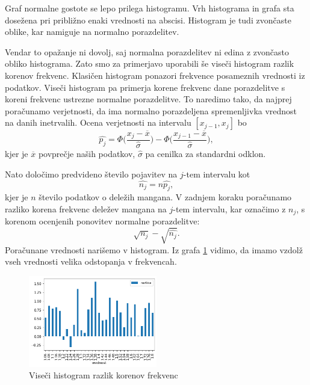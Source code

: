 \documentclass{article}
\begin{document}
Graf normalne gostote se lepo prilega histogramu. Vrh histograma in grafa sta dosežena pri 
približno enaki vrednosti na abscisi. Histogram je tudi zvončaste oblike, kar namiguje na normalno porazdelitev.

Vendar to opažanje ni dovolj, saj normalna porazdelitev ni edina z zvončasto obliko histograma.
Zato smo za primerjavo uporabili še viseči histogram razlik korenov frekvenc.
Klasičen histogram ponazori frekvence posameznih vrednosti iz podatkov. 
Viseči histogram pa primerja korene frekvenc dane porazdelitve s koreni frekvenc ustrezne normalne porazdelitve.
To naredimo tako, da najprej poračunamo verjetnosti, da ima normalno porazdeljena spremenljivka 
vrednost na danih inetrvalih. Ocena verjetnosti na intervalu $[x_{j-1}, x_j]$ bo
\begin{equation}
    \hat{p_j} = \Phi \biggl(\frac{x_j - \overline{x}}{\hat{\sigma}}\biggr) - \Phi\biggl(\frac{x_{j-1} - \overline{x}}{\hat{\sigma}}\biggr),
\end{equation}
kjer je $\overline{x}$ povprečje naših podatkov, $\hat{\sigma}$ pa cenilka za standardni odklon.

Nato določimo predvideno število pojavitev na $j$-tem intervalu kot
\begin{equation}
    \hat{n_j} = n\hat{p_j},
\end{equation}
kjer je $n$ število podatkov o deležih mangana.
V zadnjem koraku poračunamo razliko korena frekvenc deležev mangana na $j$-tem intervalu,
kar označimo z $n_j$, s korenom
ocenjenih ponovitev normalne porazdelitve:
\begin{equation}
    \sqrt{n_j} - \sqrt{\hat{n_j}}.
\end{equation}
Poračunane vrednosti narišemo v histogram.
Iz grafa \ref{2B} vidimo, da imamo vzdolž vseh vrednosti velika odstopanja v frekvencah.
\begin{figure}[H]
    \begin{center}
        \includegraphics*[width=0.5\textwidth]{figure2B.png}
        \caption{Viseči histogram razlik korenov frekvenc}
        \label{2B}
    \end{center}
\end{figure}
\end{document}
